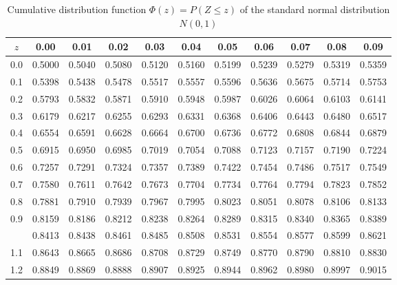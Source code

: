 \documentclass[a4paper]{article}
\theoremstyle{break}
\begin{document}

\begin{table}[H]
\centering
\caption{\label{tab:normal}Cumulative distribution function $\Phi(z)=P(Z\le z)$ of the standard normal distribution $N(0,1)$}
\begin{scriptsize}
\begin{tabular}{*{11}{r}}
\toprule
\multicolumn{1}{c}{$z$} & \multicolumn{1}{c}{0.00} & \multicolumn{1}{c}{0.01} & \multicolumn{1}{c}{0.02} & \multicolumn{1}{c}{0.03} & \multicolumn{1}{c}{0.04} & \multicolumn{1}{c}{0.05} & \multicolumn{1}{c}{0.06} & \multicolumn{1}{c}{0.07} & \multicolumn{1}{c}{0.08} & \multicolumn{1}{c}{0.09}\\
\midrule
0.0 & 0.5000 & 0.5040 & 0.5080 & 0.5120 & 0.5160 & 0.5199 & 0.5239 & 0.5279 & 0.5319 & 0.5359\\
0.1 & 0.5398 & 0.5438 & 0.5478 & 0.5517 & 0.5557 & 0.5596 & 0.5636 & 0.5675 & 0.5714 & 0.5753\\
0.2 & 0.5793 & 0.5832 & 0.5871 & 0.5910 & 0.5948 & 0.5987 & 0.6026 & 0.6064 & 0.6103 & 0.6141\\
0.3 & 0.6179 & 0.6217 & 0.6255 & 0.6293 & 0.6331 & 0.6368 & 0.6406 & 0.6443 & 0.6480 & 0.6517\\
0.4 & 0.6554 & 0.6591 & 0.6628 & 0.6664 & 0.6700 & 0.6736 & 0.6772 & 0.6808 & 0.6844 & 0.6879\\
0.5 & 0.6915 & 0.6950 & 0.6985 & 0.7019 & 0.7054 & 0.7088 & 0.7123 & 0.7157 & 0.7190 & 0.7224\\
0.6 & 0.7257 & 0.7291 & 0.7324 & 0.7357 & 0.7389 & 0.7422 & 0.7454 & 0.7486 & 0.7517 & 0.7549\\
0.7 & 0.7580 & 0.7611 & 0.7642 & 0.7673 & 0.7704 & 0.7734 & 0.7764 & 0.7794 & 0.7823 & 0.7852\\
0.8 & 0.7881 & 0.7910 & 0.7939 & 0.7967 & 0.7995 & 0.8023 & 0.8051 & 0.8078 & 0.8106 & 0.8133\\
0.9 & 0.8159 & 0.8186 & 0.8212 & 0.8238 & 0.8264 & 0.8289 & 0.8315 & 0.8340 & 0.8365 & 0.8389\\
\addlinespace
1.0 & 0.8413 & 0.8438 & 0.8461 & 0.8485 & 0.8508 & 0.8531 & 0.8554 & 0.8577 & 0.8599 & 0.8621\\
1.1 & 0.8643 & 0.8665 & 0.8686 & 0.8708 & 0.8729 & 0.8749 & 0.8770 & 0.8790 & 0.8810 & 0.8830\\
1.2 & 0.8849 & 0.8869 & 0.8888 & 0.8907 & 0.8925 & 0.8944 & 0.8962 & 0.8980 & 0.8997 & 0.9015\\

\end{tabular}
\end{scriptsize}
\end{table}
\end{document}
